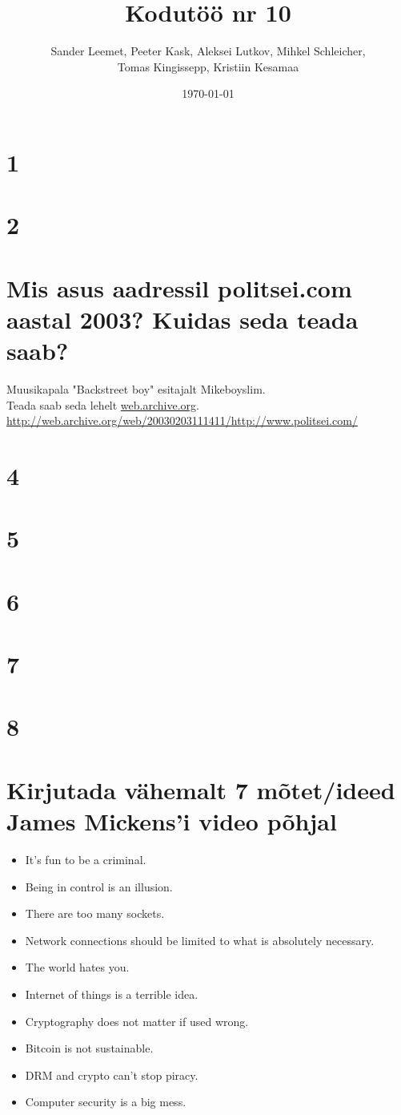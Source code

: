 \documentclass{article}
\title{Kodutöö nr 10}
\author{Sander Leemet, Peeter Kask, Aleksei Lutkov, Mihkel Schleicher,\\ Tomas Kingissepp, Kristiin Kesamaa}
\date{\today}
\begin{document}
\maketitle

\section{1}
\section{2}

\section{Mis asus aadressil politsei.com aastal 2003? Kuidas seda teada saab?}
Muusikapala "Backstreet boy" esitajalt Mikeboyslim.\\
Teada saab seda lehelt \url{web.archive.org}.\\
\url{http://web.archive.org/web/20030203111411/http://www.politsei.com/}
\section{4}
\section{5}
\section{6}
\section{7}
\section{8}
\section{Kirjutada vähemalt 7 mõtet/ideed James Mickens'i video põhjal}
	\begin{itemize}
		\item{It's fun to be a criminal.}
		\item{Being in control is an illusion.}
		\item{There are too many sockets.}
		\item{Network connections should be limited to what is absolutely necessary.}
		\item{The world hates you.}
		\item{Internet of things is a terrible idea.}
		\item{Cryptography does not matter if used wrong.}
		\item{Bitcoin is not sustainable.}
		\item{DRM and crypto can't stop piracy.}
		\item{Computer security is a big mess.}
	\end{itemize}
\end{document}
